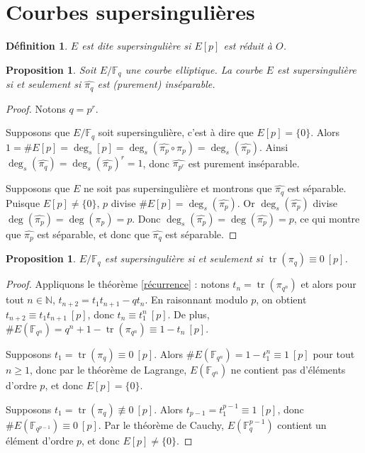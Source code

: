 \documentclass{article}
\theoremstyle{plain}%
\newtheorem{prop}[thm]{Proposition}
\newtheorem{deff}[thm]{Définition}
\theoremstyle{definition}%
\newcommand{\F}{\mathbb{F}}
\newcommand{\N}{\mathbb{N}}
\newcommand{\h}{\widehat}
\DeclareMathOperator{\tr}{tr}
\begin{document}
\section{Courbes supersingulières}

\begin{deff}
  $E$ est dite supersingulière si $E[p]$ est réduit à $O$. 
\end{deff}

\begin{prop}
  \label{pihatsep}
  Soit $E/\F_q$ une courbe elliptique. La courbe $E$ est supersingulière si et seulement si $\widehat{\pi_q}$ est (purement) inséparable.
\end{prop}

\begin{proof}
  Notons $q = p^r$. 

  Supposons que $E/\F_q$ soit supersingulière, c'est à dire que $E[p] = \{0\}$. Alors $1 = \#E[p] = \deg_s[p] = \deg_s(\h{\pi_{p}} \circ \pi_{p}) = \deg_s(\h{\pi_{p}})$. Ainsi $\deg_s(\h{\pi_{q}}) =  \deg_s(\h{\pi_{p}})^r= 1$, donc $\h{\pi_{p^r}}$ est purement inséparable.

  Supposons que $E$ ne soit pas supersingulière et montrons que $\h{\pi_{q}}$ est séparable. Puisque $E[p] \neq \{0\}$, $p$ divise $\#E[p] = \deg_s(\h{\pi_p})$. Or $\deg_s(\h{\pi_p})$ divise $\deg(\h{\pi_p}) = \deg({\pi_p}) = p$. Donc $\deg_s(\h{\pi_p}) = \deg(\h{\pi_p}) =p$, ce qui montre que $\h{\pi_p}$ est séparable, et donc que $\h{\pi_q}$ est séparable.
\end{proof}

\begin{prop}
  \label{pimodp}
  $E/\F_q$ est supersingulière si et seulement si $\tr(\pi_q) \equiv 0\ [p]$. 
\end{prop}

\begin{proof}
  Appliquons le théorème \ref{récurrence} : 
  notons $t_n = \tr(\pi_{q^n})$ 
  et alors pour tout $n\in\N$, 
  $t_{n+2} = t_1 t_{n+1} -qt_n$.
  En raisonnant modulo $p$, on obtient $t_{n+2} \equiv t_1 t_{n+1}\ [p]$, donc $t_n \equiv t_1^n\ [p]$. 
  De plus, $\#E(\F_{q^n}) = q^n + 1 - \tr(\pi_{q^n}) \equiv 1 - t_n\ [p]$.

Supposons $t_1 = \tr(\pi_q) \equiv 0\ [p]$. 
Alors $\#E(\F_{q^n}) = 1 - t_1^n \equiv 1\ [p]$ pour tout $n \ge 1$, donc par le théorème de Lagrange, $E(\F_{q^n})$ ne contient pas d’éléments d’ordre $p$, et donc $E[p] = \{0\}$.

Supposons $t_1 = \tr(\pi_q) \not\equiv 0\ [p]$. 
Alors $t_{p-1} = t_1^{p-1} \equiv 1\ [p]$, donc $\#E(\F_{q^{p-1}}) \equiv 0\ [p]$. Par le théorème de Cauchy, $E(\F_q^{p-1})$ contient un élément d’ordre $p$, et donc $E[p] \neq  \{0\}$.
\end{proof}
\end{document}
